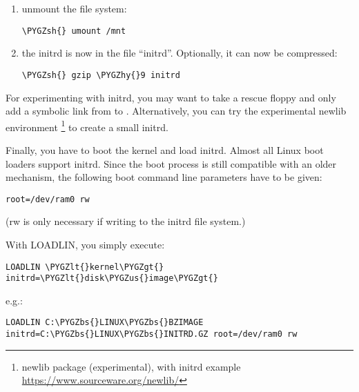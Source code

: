 \documentclass[a4paper,8pt,english]{sphinxmanual}
\def\PYGZbs{\char`\\}
\def\PYGZus{\char`\_}
\def\PYGZlt{\char`\<}
\def\PYGZgt{\char`\>}
\def\PYGZsh{\char`\#}
\def\PYGZhy{\char`\-}
\begin{document}
\begin{enumerate}
\item {} 
unmount the file system:

\begin{Verbatim}[commandchars=\\\{\}]
\PYGZsh{} umount /mnt
\end{Verbatim}

\item {} 
the initrd is now in the file ``initrd''. Optionally, it can now be
compressed:

\begin{Verbatim}[commandchars=\\\{\}]
\PYGZsh{} gzip \PYGZhy{}9 initrd
\end{Verbatim}

\end{enumerate}

For experimenting with initrd, you may want to take a rescue floppy and
only add a symbolic link from  to . Alternatively, you
can try the experimental newlib environment \footnote[2]{
newlib package (experimental), with initrd example
\href{https://www.sourceware.org/newlib/}{https://www.sourceware.org/newlib/}
} to create a small
initrd.

Finally, you have to boot the kernel and load initrd. Almost all Linux
boot loaders support initrd. Since the boot process is still compatible
with an older mechanism, the following boot command line parameters
have to be given:

\begin{Verbatim}[commandchars=\\\{\}]
root=/dev/ram0 rw
\end{Verbatim}

(rw is only necessary if writing to the initrd file system.)

With LOADLIN, you simply execute:

\begin{Verbatim}[commandchars=\\\{\}]
LOADLIN \PYGZlt{}kernel\PYGZgt{} initrd=\PYGZlt{}disk\PYGZus{}image\PYGZgt{}
\end{Verbatim}

e.g.:

\begin{Verbatim}[commandchars=\\\{\}]
LOADLIN C:\PYGZbs{}LINUX\PYGZbs{}BZIMAGE initrd=C:\PYGZbs{}LINUX\PYGZbs{}INITRD.GZ root=/dev/ram0 rw
\end{Verbatim}
\end{document}
